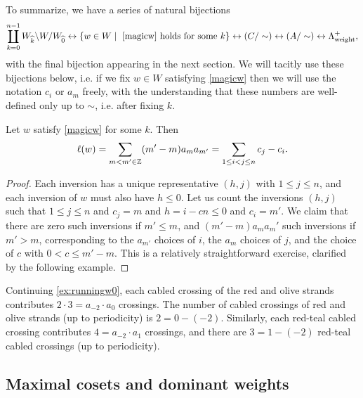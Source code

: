 To summarize, we have a series of natural bijections
\begin{equation} \label{bijections} \coprod_{k=0}^{n-1} W_{\widehat{k}} \backslash W / W_{\widehat{0}} \leftrightarrow \{w \in W \mid \text{ \eqref{magicw} holds for some } k \} \leftrightarrow (C/\sim) \leftrightarrow (A/\sim) \leftrightarrow \Lambda^+_{\operatorname{weight}}, \end{equation}
with the final bijection appearing in the next section.
We will tacitly use these bijections below, i.e. if we fix $w \in W$ satisfying \eqref{magicw} then we will use the notation $c_i$ or $a_m$ freely, with the understanding that these numbers are well-defined only up to $\sim$, i.e. after fixing $k$.

\begin{lemma} Let $w$ satisfy \eqref{magicw} for some $k$. Then 
\begin{equation} \label{lengthformula} \ell(w) = \sum_{m < m' \in \mathbb{Z}} (m'-m) a_m a_{m'} = \sum_{1 \le i < j \le n} c_j - c_i. \end{equation}
\end{lemma}

\begin{proof} Each inversion has a unique representative $(h,j)$ with $1 \le j \le n$, and each inversion of $w$ must also have $h \le 0$. Let us count the inversions $(h,j)$ such that $1 \le j \le n$ and $c_j = m$ and $h = i - cn \le 0$ and $c_i = m'$.
We claim that there are zero such inversions if $m' \le m$, and $(m'-m) a_m a_m'$ such inversions if $m' > m$, corresponding to the $a_{m'}$ choices of $i$, the $a_m$ choices of $j$, and the choice of $c$ with $0 < c \le m'-m$. This is a relatively straightforward exercise, clarified by the following example. \end{proof}

\begin{example} Continuing \cref{ex:runningw0}, each cabled crossing of the red and olive strands contributes $2 \cdot 3 = a_{-2} \cdot a_0$ crossings. The number of cabled crossings of red and olive strands (up to periodicity) is $2 = 0-(-2)$. Similarly, each red-teal cabled crossing contributes $4 = a_{-2} \cdot a_1$ crossings, and there are $3 = 1 - (-2)$ red-teal cabled crossings (up to periodicity).
\end{example}

\subsection{Maximal cosets and dominant weights}

